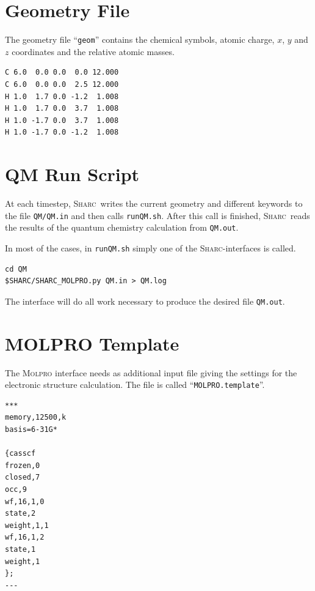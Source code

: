 \documentclass[a4paper,11pt,DIV=15,openany]{scrbook}
\newcommand{\sharc}{\textsc{Sharc}}
\newcommand{\ttt}[1]{\texttt{#1}}
\newenvironment{example}{
  \vspace{0mm}
  \definecolor{shadecolor}{HTML}{E4F4FF}
  \begin{shaded}
}{
  \end{shaded}
}
\begin{document}
\section{Geometry File}

The geometry file ``\ttt{geom}'' contains the chemical symbols, atomic charge, $x$, $y$ and $z$ coordinates and the relative atomic masses.

\begin{example}\vspace{-8mm}
\begin{verbatim}
C 6.0  0.0 0.0  0.0 12.000
C 6.0  0.0 0.0  2.5 12.000
H 1.0  1.7 0.0 -1.2  1.008
H 1.0  1.7 0.0  3.7  1.008
H 1.0 -1.7 0.0  3.7  1.008
H 1.0 -1.7 0.0 -1.2  1.008
\end{verbatim}\vspace{-5mm}
\end{example}

\section{QM Run Script}

At each timestep, \sharc\ writes the current geometry and different keywords to the file \ttt{QM/QM.in} and then calls \ttt{runQM.sh}. After this call is finished, \sharc\ reads the results of the quantum chemistry calculation from \ttt{QM.out}.

In most of the cases, in \ttt{runQM.sh} simply one of the \sharc-interfaces is called.
\begin{example}\vspace{-8mm}
\begin{verbatim}
cd QM
$SHARC/SHARC_MOLPRO.py QM.in > QM.log
\end{verbatim}\vspace{-5mm}
\end{example}
The interface will do all work necessary to produce the desired file \ttt{QM.out}.

\section{MOLPRO Template}

The \textsc{Molpro} interface needs as additional input file giving the settings for the electronic structure calculation. The file is called ``\ttt{MOLPRO.template}''.

\begin{example}\vspace{-8mm}
\begin{verbatim}
***
memory,12500,k
basis=6-31G*

{casscf
frozen,0
closed,7
occ,9
wf,16,1,0
state,2
weight,1,1
wf,16,1,2
state,1
weight,1
};
---
\end{verbatim}\vspace{-5mm}
\end{example}
\end{document}
